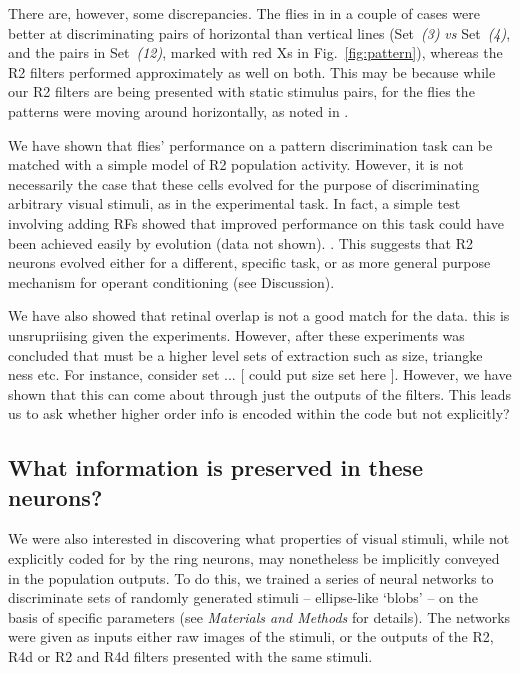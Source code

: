 There are, however, some discrepancies.
The flies in \cite{Ernst1999} in a couple of cases were better at discriminating pairs of horizontal than vertical lines (Set~\emph{(3)} \emph{vs} Set~\emph{(4)}, and the pairs in Set~\emph{(12)}, marked with red Xs in Fig.~\ref{fig:pattern}), whereas the R2 filters performed approximately as well on both.
This may be because while our R2 filters are being presented with static stimulus pairs, for the flies the patterns were moving around horizontally, as noted in \cite{Ernst1999}.
 

We have shown that flies' performance on a pattern discrimination task can be matched with a simple model of R2 population activity.
However, it is not necessarily the case that these cells evolved for the purpose of discriminating arbitrary visual stimuli, as in the experimental task.
In fact, a simple test involving adding RFs showed that improved performance on this task could have been achieved easily by evolution (data not shown). . This suggests that R2 neurons evolved either for a different, specific task, or as more general purpose mechanism for operant conditioning (see Discussion). 

 We have also showed that retinal overlap is not a good match for the data. this is unsrupriising given the experiments. 
However, after these experiments was concluded that must be a higher level sets of extraction such as size, triangke ness etc. For instance, consider set ... [ could put size set here ]. 
However, we have shown that this can come about through just the outputs of the filters.  This leads us to ask whether higher order info is encoded within the code but not explicitly?

\subsection{What information is preserved in these neurons?}

We were also interested in discovering what properties of visual stimuli, while not explicitly coded for by the ring neurons, may nonetheless be implicitly conveyed in the population outputs.
To do this, we trained a series of neural networks to discriminate sets of randomly generated stimuli -- ellipse-like `blobs' -- on the basis of specific parameters (see \emph{Materials and Methods} for details).
The networks were given as inputs either raw images of the stimuli, or the outputs of the R2, R4d or R2 and R4d filters presented with the same stimuli.

